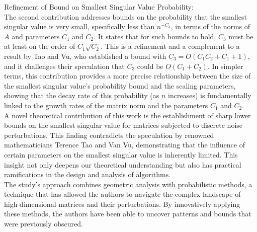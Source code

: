 Refinement of Bound on Smallest Singular Value Probability:\\
The second contribution addresses bounds on the probability that the smallest singular value is very small, specifically less than ${n^{-C_3}}$, in terms of the norms of ${A}$ and parameters ${C_1}$ and ${C_2}$. It states that for such bounds to hold, ${C_3}$ must be at least on the order of ${C_1 \sqrt{C_2}}$. This is a refinement and a complement to a result by Tao and Vu, who established a bound with ${C_3=O(C_1 C_2 + C_1 + 1)}$, and it challenges their speculation that ${C_3}$ could be ${O(C_1 + C_2)}$. In simpler terms, this contribution provides a more precise relationship between the size of the smallest singular value's probability bound and the scaling parameters, showing that the decay rate of this probability (as ${n}$ increases) is fundamentally linked to the growth rates of the matrix norm and the parameters ${C_1}$ and ${C_2}$.\\\newline
A novel theoretical contribution of this work is the establishment of sharp lower bounds on the smallest singular value for matrices subjected to discrete noise perturbations. This finding contradicts the speculation by renowned mathematicians Terence Tao and Van Vu, demonstrating that the influence of certain parameters on the smallest singular value is inherently limited. This insight not only deepens our theoretical understanding but also has practical ramifications in the design and analysis of algorithms.\\\newline
The study's approach combines geometric analysis with probabilistic methods, a technique that has allowed the authors to navigate the complex landscape of high-dimensional matrices and their perturbations. By innovatively applying these methods, the authors have been able to uncover patterns and bounds that were previously obscured.
